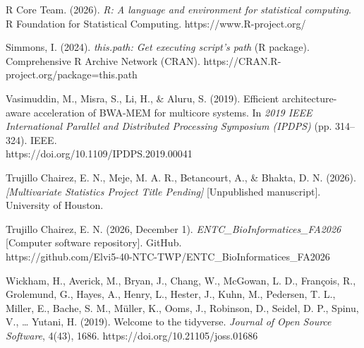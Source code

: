 \documentclass[12pt, a4paper]{article}
\begin{document}
\par\hangindent=0.5in
\noindent R Core Team. (2026). \textit{R: A language and environment for statistical computing}. R Foundation for Statistical Computing. https://www.R-project.org/

\par\hangindent=0.5in
\noindent Simmons, I. (2024). \textit{this.path: Get executing script's path} (R package). Comprehensive R Archive Network (CRAN). https://CRAN.R-project.org/package=this.path

\par\hangindent=0.5in
\noindent Vasimuddin, M., Misra, S., Li, H., \& Aluru, S. (2019). Efficient architecture-aware acceleration of BWA-MEM for multicore systems. In \textit{2019 IEEE International Parallel and Distributed Processing Symposium (IPDPS)} (pp. 314--324). IEEE.  \\ https://doi.org/10.1109/IPDPS.2019.00041

\par\hangindent=0.5in
\noindent Trujillo Chairez, E. N., Meje, M. A. R., Betancourt, A., \& Bhakta, D. N. (2026). \textit{[Multivariate Statistics Project Title Pending]} [Unpublished manuscript]. University of Houston.

\par\hangindent=0.5in
\noindent Trujillo Chairez, E. N. (2026, December 1). \textit{ENTC\_BioInformatices\_FA2026} [Computer software repository]. GitHub. \\ https://github.com/Elvi5-40-NTC-TWP/ENTC\_\allowbreak BioInformatices\_\allowbreak FA2026

\par\hangindent=0.5in
\noindent Wickham, H., Averick, M., Bryan, J., Chang, W., McGowan, L. D., Fran\c{c}ois, R., Grolemund, G., Hayes, A., Henry, L., Hester, J., Kuhn, M., Pedersen, T. L., Miller, E., Bache, S. M., M\"{u}ller, K., Ooms, J., Robinson, D., Seidel, D. P., Spinu, V., \ldots{} Yutani, H. (2019). Welcome to the tidyverse. \textit{Journal of Open Source Software}, 4(43), 1686. https://doi.org/10.21105/joss.01686
\end{document}
